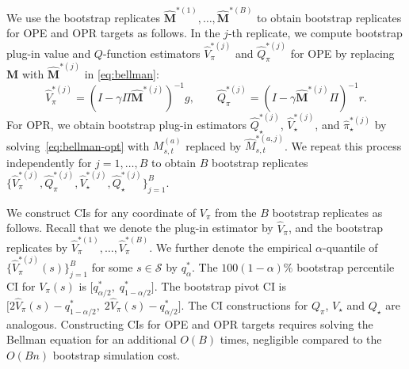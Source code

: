 \documentclass{article}
\numberwithin{equation}{section}
\begin{document}
We use the bootstrap replicates $\hat{\mathbf{M}}^{\ast(1)},\dots,\hat{\mathbf{M}}^{\ast(B)}$ to obtain bootstrap replicates for OPE and OPR targets as follows.
In the $j$-th replicate, we compute bootstrap plug-in value and $Q$-function estimators $\hat V_\pi^{\ast(j)}$ and $\hat Q_\pi^{\ast(j)}$ for OPE by replacing $\mathbf{M}$ with $\hat{\mathbf{M}}^{\ast(j)}$ in \eqref{eq:bellman}:
\begin{equation}
\hat V_\pi^{\ast(j)} = (I-\gamma\Pi\hat{\mathbf{M}}^{\ast(j)})^{-1}g,
\qquad
\hat Q_\pi^{\ast(j)} = (I-\gamma\hat{\mathbf{M}}^{\ast(j)}\Pi)^{-1}r.
\end{equation}
For OPR, we obtain bootstrap plug-in estimators $\hat Q_\star^{\ast(j)}$, $\hat V_\star^{\ast(j)}$, and $\hat\pi_\star^{\ast(j)}$ by solving~\eqref{eq:bellman-opt} with $M^{(a)}_{s,t}$ replaced by $\hat M^{\ast (a,j)}_{s,t}$.
We repeat this process independently for $j=1,\ldots,B$ to obtain $B$ bootstrap replicates $\bigl\{\hat V_\pi^{\ast(j)},\hat Q_\pi^{\ast(j)},\hat V_\star^{\ast(j)}, \hat Q_\star^{\ast(j)}\bigr\}_{j=1}^B$.

We construct CIs for any coordinate of $V_\pi$ from the $B$ bootstrap replicates as follows.
Recall that we denote the plug-in estimator by $\hat V_\pi$, and the bootstrap replicates by $\hat V_\pi^{\ast (1)},\dots,\hat V_\pi^{\ast (B)}$.
We further denote the empirical $\alpha$-quantile of $\{\hat V_\pi^{\ast (j)}(s)\}_{j=1}^B$ for some $s \in \mathcal S$ by $q_\alpha^*$.
The $100(1-\alpha)\%$ bootstrap percentile CI for $V_\pi(s)$ is $\bigl[q_{\alpha/2}^*,\;q_{1-\alpha/2}^*\bigr]$.
The bootstrap pivot CI is $\bigl[2\hat V_\pi(s) - q_{1-\alpha/2}^*,\;2\hat V_\pi(s) - q_{\alpha/2}^*\bigr]$.
The CI constructions for $Q_\pi$, $V_\star$ and $Q_\star$ are analogous.
Constructing CIs for OPE and OPR targets requires solving the Bellman equation for an additional $O(B)$ times, negligible compared to the $O(Bn)$ bootstrap simulation cost.
\end{document}
